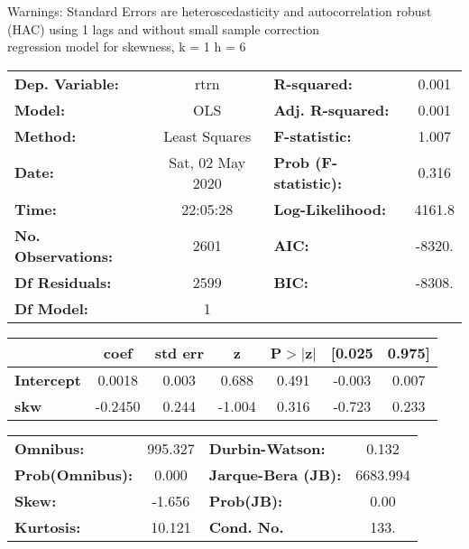 Warnings: \newline
 [1] Standard Errors are heteroscedasticity and autocorrelation robust (HAC) using 1 lags and without small sample correction\\ 

regression model for skewness, k = 1 h = 6\begin{center}
\begin{tabular}{lclc}
\toprule
\textbf{Dep. Variable:}    &       rtrn       & \textbf{  R-squared:         } &     0.001   \\
\textbf{Model:}            &       OLS        & \textbf{  Adj. R-squared:    } &     0.001   \\
\textbf{Method:}           &  Least Squares   & \textbf{  F-statistic:       } &     1.007   \\
\textbf{Date:}             & Sat, 02 May 2020 & \textbf{  Prob (F-statistic):} &    0.316    \\
\textbf{Time:}             &     22:05:28     & \textbf{  Log-Likelihood:    } &    4161.8   \\
\textbf{No. Observations:} &        2601      & \textbf{  AIC:               } &    -8320.   \\
\textbf{Df Residuals:}     &        2599      & \textbf{  BIC:               } &    -8308.   \\
\textbf{Df Model:}         &           1      & \textbf{                     } &             \\
\bottomrule
\end{tabular}
\begin{tabular}{lcccccc}
                   & \textbf{coef} & \textbf{std err} & \textbf{z} & \textbf{P$> |$z$|$} & \textbf{[0.025} & \textbf{0.975]}  \\
\midrule
\textbf{Intercept} &       0.0018  &        0.003     &     0.688  &         0.491        &       -0.003    &        0.007     \\
\textbf{skw}       &      -0.2450  &        0.244     &    -1.004  &         0.316        &       -0.723    &        0.233     \\
\bottomrule
\end{tabular}
\begin{tabular}{lclc}
\textbf{Omnibus:}       & 995.327 & \textbf{  Durbin-Watson:     } &    0.132  \\
\textbf{Prob(Omnibus):} &   0.000 & \textbf{  Jarque-Bera (JB):  } & 6683.994  \\
\textbf{Skew:}          &  -1.656 & \textbf{  Prob(JB):          } &     0.00  \\
\textbf{Kurtosis:}      &  10.121 & \textbf{  Cond. No.          } &     133.  \\
\bottomrule
\end{tabular}
\end{center}

